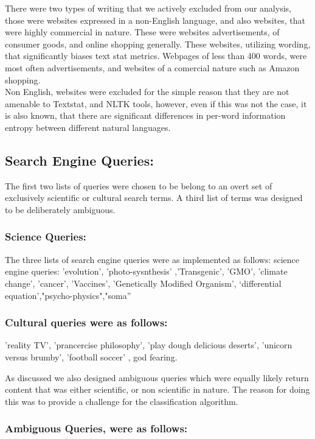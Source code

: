 \documentclass{clv3}
\begin{document}
There were two types of writing that we actively excluded from our analysis, those were websites expressed in a non-English language, and also websites, that were highly commercial in nature. These were websites advertisements, of consumer goods, and online shopping generally. These websites, utilizing wording, that significantly biases text stat metrics. Webpages of less than 400 words, were most often advertisements, and websites of a comercial nature such as Amazon shopping.\\

Non English, websites were excluded for the simple reason that they are not amenable to Textstat, and NLTK tools, however, even if this was not the case, it is also known, that there are  significant differences in per-word information entropy between different natural languages.

\subsection{Search Engine Queries:}
The first two lists of queries were chosen to be belong to an overt set of exclusively scientific or cultural search terms. A third list of terms was designed to be deliberately ambiguous.

\subsubsection{Science Queries:}
The three lists of search engine queries were as implemented as follows: science engine queries: 'evolution', 'photo-sysnthesis' ,'Transgenic', 'GMO', 'climate change', 'cancer', 'Vaccines', 'Genetically Modified Organism', ‘differential equation’,"psycho-physics","soma”

\subsubsection{Cultural queries were as follows:} 'reality TV', 'prancercise philosophy', 'play dough delicious deserts', 'unicorn versus brumby', 'football soccer' , god fearing.

As discussed we also designed ambiguous queries which were equally likely return content that was either scientific, or non scientific in nature. The reason for doing this was to provide a challenge for the classification algorithm.

\subsubsection{Ambiguous Queries, were as follows:}
\end{document}

